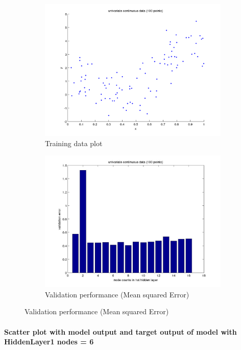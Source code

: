 \documentclass[fleqn]{article}
\newcommand{\myparagraph}[1]{\paragraph{#1}\mbox{}\\}
\begin{document}
\begin{figure}[!ht]
\begin{subfigure}{.5\textwidth}
  \caption{Training data plot}
\includegraphics[scale=0.5]{pics/univariate100_morenoise/dataPlot}
\end{subfigure}
\begin{subfigure}{.5\textwidth}
\caption{Validation performance (Mean squared Error)}
\includegraphics[scale=0.2]{pics/univariate100_morenoise/univariate continuous data (100 points)_validationerror}
\end{subfigure}
\end{figure}

\newpage
\myparagraph{Scatter plot with model output and target output of model with HiddenLayer1 nodes = 6}
\end{document}
